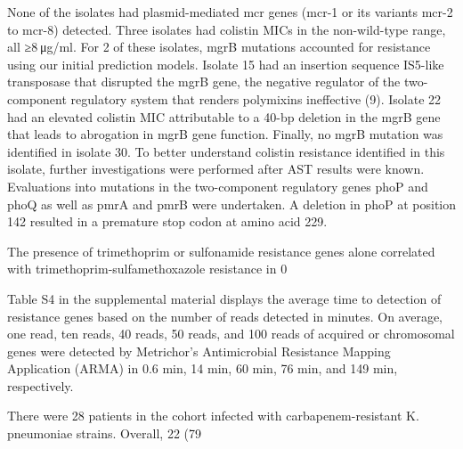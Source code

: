 None of the isolates had plasmid-mediated mcr genes (mcr-1 or its variants mcr-2 to mcr-8) detected. Three isolates had colistin MICs in the non-wild-type range, all ≥8 μg/ml. For 2 of these isolates, mgrB mutations accounted for resistance using our initial prediction models. Isolate 15 had an insertion sequence IS5-like transposase that disrupted the mgrB gene, the negative regulator of the two-component regulatory system that renders polymixins ineffective (9). Isolate 22 had an elevated colistin MIC attributable to a 40-bp deletion in the mgrB gene that leads to abrogation in mgrB gene function. Finally, no mgrB mutation was identified in isolate 30. To better understand colistin resistance identified in this isolate, further investigations were performed after AST results were known. Evaluations into mutations in the two-component regulatory genes phoP and phoQ as well as pmrA and pmrB were undertaken. A deletion in phoP at position 142 resulted in a premature stop codon at amino acid 229.

The presence of trimethoprim or sulfonamide resistance genes alone correlated with trimethoprim-sulfamethoxazole resistance in 0%

Table S4 in the supplemental material displays the average time to detection of resistance genes based on the number of reads detected in minutes. On average, one read, ten reads, 40 reads, 50 reads, and 100 reads of acquired or chromosomal genes were detected by Metrichor’s Antimicrobial Resistance Mapping Application (ARMA) in 0.6 min, 14 min, 60 min, 76 min, and 149 min, respectively.

There were 28 patients in the cohort infected with carbapenem-resistant K. pneumoniae strains. Overall, 22 (79%

